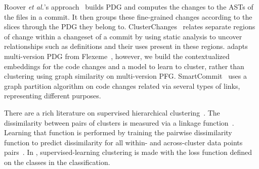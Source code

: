  Roover {\em et al.}'s
approach~\cite{roover-scam18} builds PDG and computes the changes to
the ASTs of the files in a commit. It then groups these fine-grained
changes according to the slices through the PDG they belong to.
ClusterChanges~\cite{barnett-icse15} relates separate regions of
change within a changeset of a commit by using static analysis to
uncover relationships such as definitions and their uses present in
these regions. {\tool} adapts multi-version PDG from
Flexeme~\cite{flexeme-fse20}, however, we build the contextualized
embeddings for the code changes and a model to learn to cluster,
rather than clustering using graph similarity on multi-version PFG.
SmartCommit~\cite{smartcommit-fse21} uses a graph partition algorithm
on code changes related via several types of links, representing
different purposes.

There are a rich literature on supervised hierarchical
clustering~\cite{pmlr-v97-yadav19a,finley-icml05,liu13,GuhaIBB15,kenyon-dean-etal-2018-resolving,tie19}.
The dissimilarity between pairs of clusters is measured via a linkage
function~\cite{moseley-nips17,GuhaIBB15,pmlr-v97-yadav19a,lee-etal-2012-joint}. Learning
that function is performed by training the pairwise
dissimilarity function to predict dissimilarity for all within- and
across-cluster data points
pairs~\cite{pmlr-v97-yadav19a,kenyon-dean-etal-2018-resolving}. In
{\tool}, supervised-learning clustering is made with the loss function
defined on the classes in the classification.

